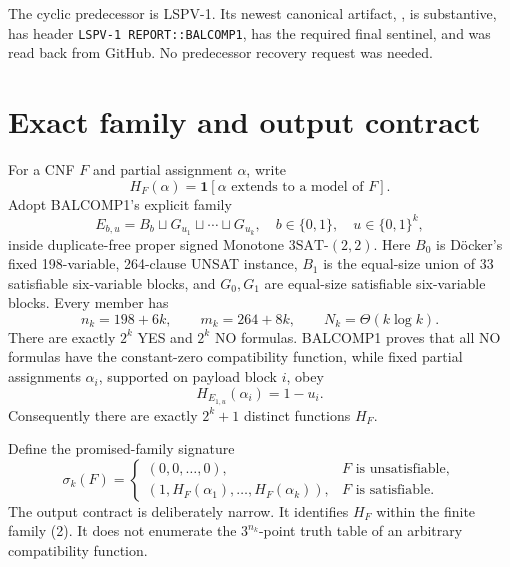 \documentclass[11pt]{article}
\begin{document}
The cyclic predecessor is LSPV-1.  Its newest canonical artifact,
, is
substantive, has header
\texttt{LSPV-1 REPORT::BALCOMP1}, has the required final sentinel, and was
read back from GitHub.  No predecessor recovery request was needed.

\section{Exact family and output contract}
For a CNF \(F\) and partial assignment \(\alpha\), write
\[
 H_F(\alpha)=\mathbf 1[\alpha\text{ extends to a model of }F].       \tag{1}
\]
Adopt BALCOMP1's explicit family
\[
 E_{b,u}=B_b\sqcup G_{u_1}\sqcup\cdots\sqcup G_{u_k},
 \quad b\in\{0,1\},\quad u\in\{0,1\}^k,                           \tag{2}
\]
inside duplicate-free proper signed Monotone
\(3\mathrm{SAT}\text{-}(2,2)\).  Here \(B_0\) is D\"ocker's fixed
198-variable, 264-clause UNSAT instance, \(B_1\) is the equal-size union of
33 satisfiable six-variable blocks, and \(G_0,G_1\) are equal-size
satisfiable six-variable blocks.  Every member has
\[
 n_k=198+6k,\qquad m_k=264+8k,\qquad N_k=\Theta(k\log k).            \tag{3}
\]
There are exactly \(2^k\) YES and \(2^k\) NO formulas.  BALCOMP1 proves that
all NO formulas have the constant-zero compatibility function, while fixed
partial assignments \(\alpha_i\), supported on payload block \(i\), obey
\[
 H_{E_{1,u}}(\alpha_i)=1-u_i.                                      \tag{4}
\]
Consequently there are exactly \(2^k+1\) distinct functions \(H_F\).

Define the promised-family signature
\[
 \sigma_k(F)=
 \begin{cases}
 (0,0,\ldots,0),&F\text{ is unsatisfiable},\\
 (1,H_F(\alpha_1),\ldots,H_F(\alpha_k)),&F\text{ is satisfiable}.
 \end{cases}                                                       \tag{5}
\]
The output contract is deliberately narrow.  It identifies \(H_F\) within
the finite family (2).  It does not enumerate the \(3^{n_k}\)-point truth
table of an arbitrary compatibility function.
\end{document}
